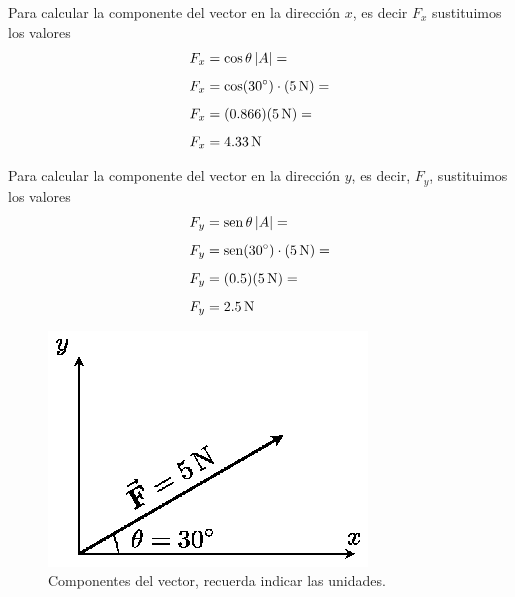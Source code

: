 \documentclass[14pt]{extarticle}
\renewcommand{\sin}{\operatorname{sen}}
\begin{document}
Para calcular la componente del vector en la dirección $x$, es decir $F_{x}$ sustituimos los valores 
\begin{align*}
F_{x} &= \cos \theta \, \abs{A} =  \\[0.5em] 
F_{x} &= \cos (\ang{30}) \cdot (\SI{5}{\newton}) =  \\[0.5em] 
F_{x} &= (0.866) (\SI{5}{\newton}) =  \\[0.5em] 
F_{x} &= \SI{4.33}{\newton}
\end{align*}

Para calcular la componente del vector en la dirección $y$, es decir, $F_{y}$, sustituimos los valores 
\begin{align*}
F_{y} &= \sin \theta \, \abs{A} =  \\[0.5em] 
F_{y} &= \sin (\ang{30}) \cdot (\SI{5}{\newton}) =  \\[0.5em] 
F_{y} &= (0.5) (\SI{5}{\newton}) =  \\[0.5em] 
F_{y} &= \SI{2.5}{\newton}
\end{align*}

\begin{figure}[H]
    \centering
    \includegraphics[scale=1.2]{Imagenes/Componentes_Vector_04.eps}
    \caption{Componentes del vector, recuerda indicar las unidades.}
\end{figure}


\end{document}
